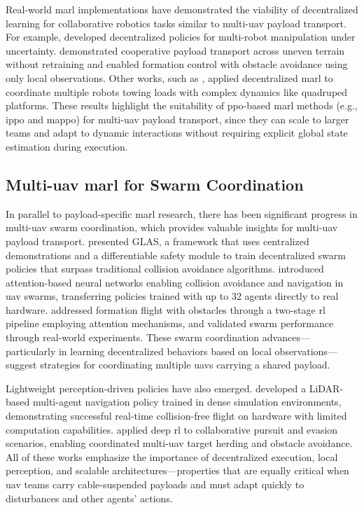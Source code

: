 Real-world \gls{marl} implementations have demonstrated the viability of decentralized learning for collaborative robotics tasks similar to multi-\gls{uav} payload transport. For example, \cite{Chen2022TowardsHBA} developed decentralized policies for multi-robot manipulation under uncertainty. \cite{Pandit2024LearningDM} demonstrated cooperative payload transport across uneven terrain without retraining and \cite{Ji2021ReinforcementLF} enabled formation control with obstacle avoidance using only local observations. Other works, such as \cite{Chen2025DecentralizedNO}, applied decentralized \gls{marl} to coordinate multiple robots towing loads with complex dynamics like quadruped platforms. These results highlight the suitability of \gls{ppo}-based \gls{marl} methods (e.g., \gls{ippo} and \gls{mappo}) for multi-\gls{uav} payload transport, since they can scale to larger teams and adapt to dynamic interactions without requiring explicit global state estimation during execution.

\subsection{Multi-\gls{uav} \gls{marl} for Swarm Coordination}
In parallel to payload-specific \gls{marl} research, there has been significant progress in multi-\gls{uav} swarm coordination, which provides valuable insights for multi-\gls{uav} payload transport. \cite{riviere_glas_2020} presented GLAS, a framework that uses centralized demonstrations and a differentiable safety module to train decentralized swarm policies that surpass traditional collision avoidance algorithms. \cite{huang_collision_2024} introduced attention-based neural networks enabling collision avoidance and navigation in \gls{uav} swarms, transferring policies trained with up to 32 agents directly to real hardware. \cite{xie_multi-uav_2024} addressed formation flight with obstacles through a two-stage \gls{rl} pipeline employing attention mechanisms, and validated swarm performance through real-world experiments. These swarm coordination advances—particularly in learning decentralized behaviors based on local observations—suggest strategies for coordinating multiple \gls{uav}s carrying a shared payload.

Lightweight perception-driven policies have also emerged. \cite{diao_efficient_2024} developed a LiDAR-based multi-agent navigation policy trained in dense simulation environments, demonstrating successful real-time collision-free flight on hardware with limited computation capabilities. \cite{zhao_deep_2024} applied deep \gls{rl} to collaborative pursuit and evasion scenarios, enabling coordinated multi-\gls{uav} target herding and obstacle avoidance. All of these works emphasize the importance of decentralized execution, local perception, and scalable architectures—properties that are equally critical when \gls{uav} teams carry cable-suspended payloads and must adapt quickly to disturbances and other agents' actions.

